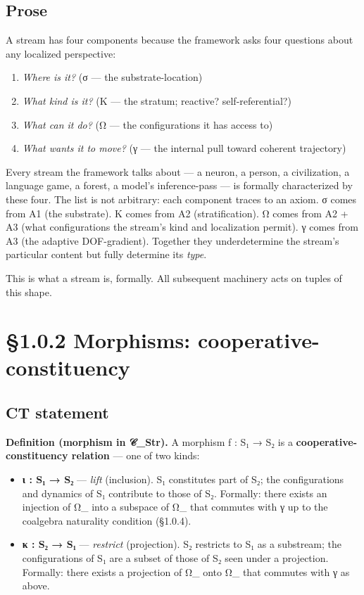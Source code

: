 \documentclass[11pt, openany]{book}
\newcommand{\sectionbreak}{\clearpage}
\begin{document}
\subsection{Prose}

A stream has four components because the framework asks four questions about any localized perspective:

\begin{enumerate}
\item \textit{Where is it?} (σ --- the substrate-location)
\item \textit{What kind is it?} (K --- the stratum; reactive? self-referential?)
\item \textit{What can it do?} (Ω --- the configurations it has access to)
\item \textit{What wants it to move?} (γ --- the internal pull toward coherent trajectory)
\end{enumerate}

Every stream the framework talks about --- a neuron, a person, a civilization, a language game, a forest, a model's inference-pass --- is formally characterized by these four. The list is not arbitrary: each component traces to an axiom. σ comes from A1 (the substrate). K comes from A2 (stratification). Ω comes from A2 + A3 (what configurations the stream's kind and localization permit). γ comes from A3 (the adaptive DOF-gradient). Together they underdetermine the stream's particular content but fully determine its \textit{type}.

This is what a stream is, formally. All subsequent machinery acts on tuples of this shape.

\sectionbreak

\section{§1.0.2 Morphisms: cooperative-constituency}

\subsection{CT statement}

\textbf{Definition (morphism in 𝒞\_\allowbreak{}Str).} A morphism f : S₁ → S₂ is a \textbf{cooperative-constituency relation} --- one of two kinds:

\begin{itemize}
\item \textbf{ι : S₁ → S₂} --- \textit{lift} (inclusion). S₁ constitutes part of S₂; the configurations and dynamics of S₁ contribute to those of S₂. Formally: there exists an injection of Ω\_ into a subspace of Ω\_ that commutes with γ up to the coalgebra naturality condition (§1.0.4).
\item \textbf{κ : S₂ → S₁} --- \textit{restrict} (projection). S₂ restricts to S₁ as a substream; the configurations of S₁ are a subset of those of S₂ seen under a projection. Formally: there exists a projection of Ω\_ onto Ω\_ that commutes with γ as above.
\end{itemize}
\end{document}
